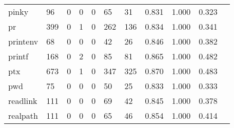 \begin{longtable}{lp{1.10cm}p{1.10cm}p{1.10cm}p{1.10cm}p{1.10cm}p{1.10cm}p{1.10cm}p{1.10cm}p{1.10cm}p{1.10cm}}
pinky     &                     96 &                                  0 &                                 0 &                                0 &                                65 &                              31 &                          0.831 &                                 1.000 &                               0.323 \\
pr        &                    399 &                                  0 &                                 1 &                                0 &                               262 &                             136 &                          0.834 &                                 1.000 &                               0.341 \\
printenv  &                     68 &                                  0 &                                 0 &                                0 &                                42 &                              26 &                          0.846 &                                 1.000 &                               0.382 \\
printf    &                    168 &                                  0 &                                 2 &                                0 &                                85 &                              81 &                          0.865 &                                 1.000 &                               0.482 \\
ptx       &                    673 &                                  0 &                                 1 &                                0 &                               347 &                             325 &                          0.870 &                                 1.000 &                               0.483 \\
pwd       &                     75 &                                  0 &                                 0 &                                0 &                                50 &                              25 &                          0.833 &                                 1.000 &                               0.333 \\
readlink  &                    111 &                                  0 &                                 0 &                                0 &                                69 &                              42 &                          0.845 &                                 1.000 &                               0.378 \\
realpath  &                    111 &                                  0 &                                 0 &                                0 &                                65 &                              46 &                          0.854 &                                 1.000 &                               0.414 \\

\end{longtable}
